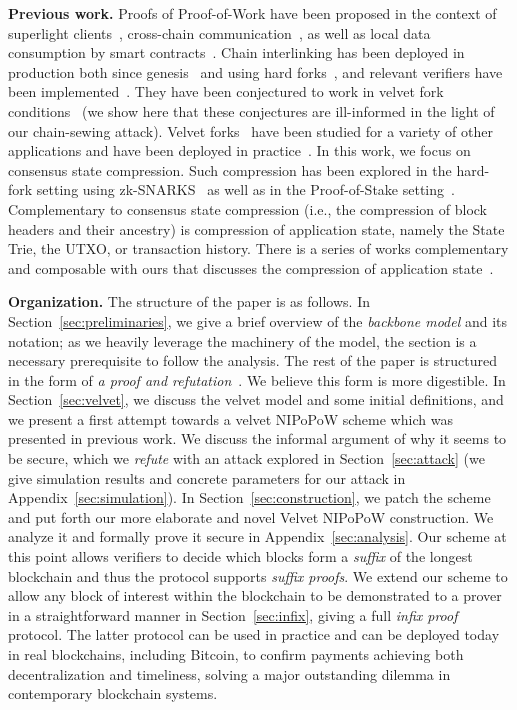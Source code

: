 \noindent
\textbf{Previous work.} Proofs of Proof-of-Work have been proposed in the
context of superlight clients~\cite{nipopows,flyclient},
cross-chain communication~\cite{pow-sidechains,burn,crosschain-sok}, as well as
local data consumption by smart contracts~\cite{derivatives}. Chain interlinking
has been deployed in production both since genesis~\cite{ergo,nimiq} and using
hard forks~\cite{heartwood-flyclient}, and relevant verifiers have been
implemented~\cite{gglou,nipopow-gas}. They have
been conjectured to work in velvet fork conditions~\cite{nipopows} (we show
here that these conjectures are ill-informed in the light of our chain-sewing
attack). Velvet forks~\cite{velvet} have been studied for a variety of other
applications and have been deployed in practice~\cite{gtklocker}. In this work,
we focus on consensus state compression. Such compression has been explored in
the hard-fork setting using zk-SNARKS~\cite{coda} as well as in the
Proof-of-Stake setting~\cite{pos-sidechains}. Complementary to consensus state
compression (i.e., the compression of block headers and their ancestry) is
compression of application state, namely the State Trie, the UTXO, or
transaction history. There is a series of works complementary and composable with ours that
discusses the compression of application state~\cite{edrax,ethanos}.

\noindent
\textbf{Organization.}
The structure of the paper is as follows. In Section~\ref{sec:preliminaries}, we
give a brief overview of the \emph{backbone model} and its notation; as we
heavily leverage the machinery of the model, the section is a necessary
prerequisite to follow the analysis. The rest of the paper is structured in the
form of \emph{a proof and refutation}~\cite{lakatos}. We believe this form is
more digestible. In Section~\ref{sec:velvet}, we discuss the velvet model and
some initial definitions, and we present a first attempt towards a velvet
NIPoPoW scheme which was presented in previous work. We discuss the informal
argument of why it seems to be secure, which we \emph{refute} with an attack explored
in Section~\ref{sec:attack} (we give simulation results and concrete parameters
for our attack in Appendix~\ref{sec:simulation}). In Section~\ref{sec:construction}, we patch the
scheme and put forth our more elaborate and novel Velvet NIPoPoW construction.
We analyze it and formally prove it secure in Appendix~\ref{sec:analysis}. Our scheme at this
point allows verifiers to decide which blocks form a \emph{suffix} of the
longest blockchain and thus the protocol supports \emph{suffix proofs}. We
extend our scheme to allow any block of interest within the blockchain to be
demonstrated to a prover in a straightforward manner in
Section~\ref{sec:infix}, giving a full \emph{infix proof} protocol. The latter
protocol can be used in practice and can be deployed today in real blockchains,
including Bitcoin, to confirm payments achieving both decentralization and
timeliness, solving a major outstanding dilemma in contemporary blockchain
systems.
